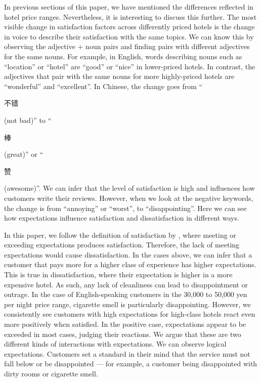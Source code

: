 \documentclass[smallextended,natbib]{svjour3}       %
\begin{document}
    In previous sections of this paper, we have mentioned the differences reflected in hotel price ranges. Nevertheless, it is interesting to discuss this further. The most visible change in satisfaction factors across differently priced hotels is the change in voice to describe their satisfaction with the same topics. We can know this by observing the adjective + noun pairs and finding pairs with different adjectives for the same nouns. For example, in English, words describing nouns such as ``location'' or ``hotel'' are ``good'' or ``nice'' in lower-priced hotels. In contrast, the adjectives that pair with the same nouns for more highly-priced hotels are ``wonderful'' and ``excellent''. In Chinese, the change goes from ``\begin{CJK}{UTF8}{gbsn}不错\end{CJK} (not bad)'' to ``\begin{CJK}{UTF8}{gbsn}棒\end{CJK} (great)'' or ``\begin{CJK}{UTF8}{gbsn}赞\end{CJK} (awesome)''. We can infer that the level of satisfaction is high and influences how customers write their reviews. However, when we look at the negative keywords, the change is from ``annoying'' or ``worst'', to ``disappointing''. Here we can see how expectations influence satisfaction and dissatisfaction in different ways. 

    In this paper, we follow the definition of satisfaction by \cite{hunt1975}, where meeting or exceeding expectations produces satisfaction. Therefore, the lack of meeting expectations would cause dissatisfaction. In the cases above, we can infer that a customer that pays more for a higher class of experience has higher expectations. This is true in dissatisfaction, where their expectation is higher in a more expensive hotel. As such, any lack of cleanliness can lead to disappointment or outrage. In the case of English-speaking customers in the 30,000 to 50,000 yen per night price range, cigarette smell is particularly disappointing. However, we consistently see customers with high expectations for high-class hotels react even more positively when satisfied. In the positive case, expectations appear to be exceeded in most cases, judging their reactions. We argue that these are two different kinds of interactions with expectations. We can observe logical expectations. Customers set a standard in their mind that the service must not fall below or be disappointed — for example, a customer being disappointed with dirty rooms or cigarette smell.
\end{document}
